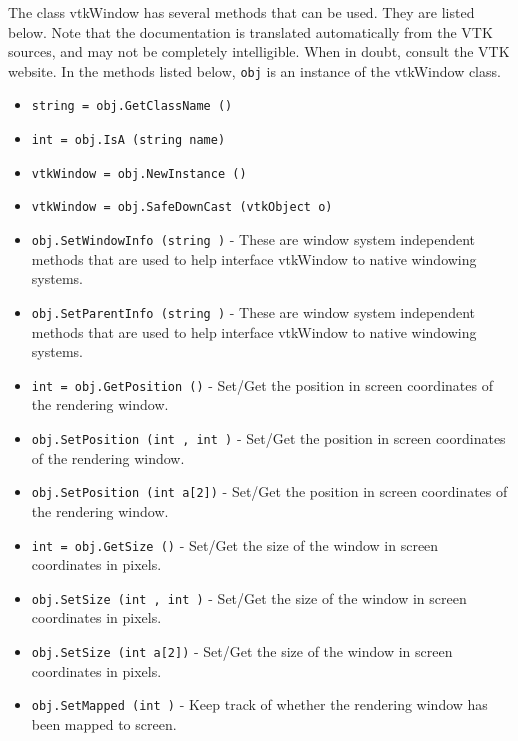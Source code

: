 The class vtkWindow has several methods that can be used.
  They are listed below.
Note that the documentation is translated automatically from the VTK sources,
and may not be completely intelligible.  When in doubt, consult the VTK website.
In the methods listed below, \verb|obj| is an instance of the vtkWindow class.
\begin{itemize}
\item  \verb|string = obj.GetClassName ()|

\item  \verb|int = obj.IsA (string name)|

\item  \verb|vtkWindow = obj.NewInstance ()|

\item  \verb|vtkWindow = obj.SafeDownCast (vtkObject o)|

\item  \verb|obj.SetWindowInfo (string )| -  These are window system independent methods that are used
 to help interface vtkWindow to native windowing systems.

\item  \verb|obj.SetParentInfo (string )| -  These are window system independent methods that are used
 to help interface vtkWindow to native windowing systems.

\item  \verb|int = obj.GetPosition ()| -  Set/Get the position in screen coordinates of the rendering window.

\item  \verb|obj.SetPosition (int , int )| -  Set/Get the position in screen coordinates of the rendering window.

\item  \verb|obj.SetPosition (int a[2])| -  Set/Get the position in screen coordinates of the rendering window.

\item  \verb|int = obj.GetSize ()| -  Set/Get the size of the window in screen coordinates in pixels.

\item  \verb|obj.SetSize (int , int )| -  Set/Get the size of the window in screen coordinates in pixels.

\item  \verb|obj.SetSize (int a[2])| -  Set/Get the size of the window in screen coordinates in pixels.

\item  \verb|obj.SetMapped (int )| -  Keep track of whether the rendering window has been mapped to screen.


\end{itemize}

